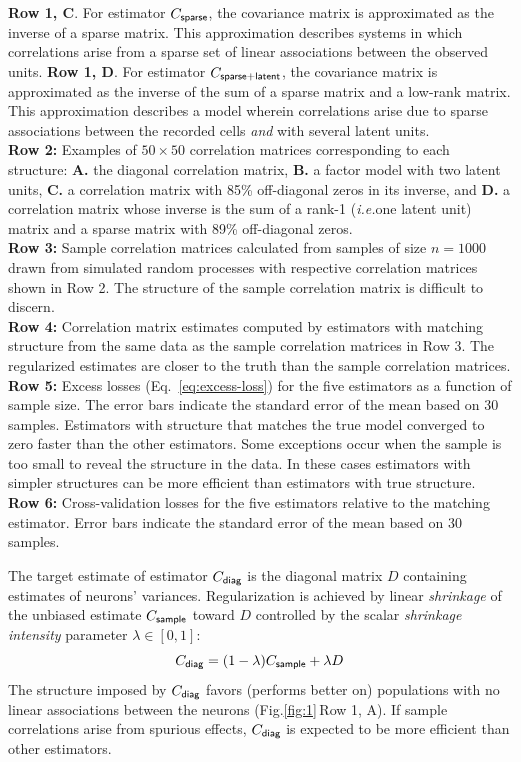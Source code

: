 \documentclass[10pt]{article}
\newcommand{\figref}[2]{Fig.\;\ref{fig:#1}\,#2}
\newcommand{\ie}{\emph{i.e.}\;}
\begin{document}
\begin{FPfigure}
{        {\bf  Row 1, C}. For estimator $C_{\sf sparse}$, the covariance matrix is approximated as the inverse of a sparse matrix. This approximation describes systems in which correlations arise from a sparse set of  linear associations between the observed units. 
        {\bf  Row 1, D}.  For estimator $C_{\sf sparse+latent}$, the covariance matrix is approximated as the inverse of the sum of a sparse matrix and a low-rank matrix. This approximation describes a model wherein correlations arise due to sparse associations between the recorded cells \emph{and} with several latent units. \\
{\bf Row 2:} Examples of $50\times 50$ correlation matrices corresponding to each structure: {\bf A.} the diagonal correlation matrix, {\bf B.} a factor model with two latent units, {\bf C.}  a correlation matrix with 85\%  off-diagonal zeros in its inverse, and {\bf  D.} a correlation matrix whose inverse is the sum of a rank-1 (\ie one latent unit) matrix and a sparse matrix with 89\% off-diagonal zeros. 
\\
{\bf Row 3:} Sample correlation matrices calculated from samples of size $n=1000$ drawn from simulated random processes with respective correlation matrices shown in Row 2.  The structure of the sample correlation matrix is difficult to discern.
\\
{\bf Row 4:} Correlation matrix estimates computed by estimators with matching structure from the same data as the sample correlation matrices in Row 3. The regularized estimates are closer to the truth than the sample correlation matrices.
\\
{\bf Row 5:} Excess losses (Eq.~\ref{eq:excess-loss}) for the five estimators as a function of sample size. The error bars indicate the standard error of the mean based on 30 samples.  Estimators with structure that matches the true model converged to zero faster than the other estimators. Some exceptions occur when the sample is too small to reveal the structure in the data. In these cases estimators with simpler structures can be more efficient than estimators with true structure.
\\
{\bf Row 6:} Cross-validation losses for the five estimators relative to the matching estimator. Error bars indicate the standard error of the mean based on 30 samples.
    }
    \label{fig:1}
\end{FPfigure} 

The target estimate of estimator $C_{\sf diag}$ is the diagonal matrix $D$ containing estimates of neurons' variances. Regularization is achieved by linear \emph{shrinkage} of the unbiased estimate $C_{\sf sample}$ toward $D$ controlled by the scalar \emph{shrinkage intensity} parameter $\lambda \in [0, 1]$:
\begin{equation}\label{eq:c-diag}
C_{\sf diag} = (1-\lambda) C_{\sf sample} + \lambda D
\end{equation}
The structure imposed by $C_{\sf diag}$ favors (performs better  on) populations   with no linear associations between the neurons (\figref{1}{Row 1, A}).  If sample correlations arise from spurious effects, $C_{\sf diag}$ is expected to be more efficient than other estimators. 
\end{document}

